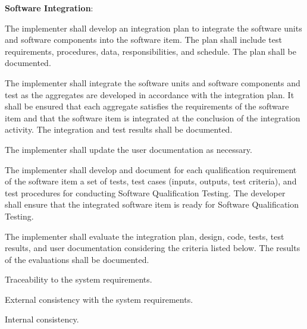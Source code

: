 			\begin{adjustwidth}{2em}{0pt} 

				\begin{compactenum}

					\item {\bf Software Integration}:

					\begin{compactenum}

						\item The implementer shall develop an integration plan to integrate the software units and software components into the software item. The plan shall include test requirements, procedures, data, responsibilities, and schedule. The plan shall be documented.

						\item The implementer shall integrate the software units and software components and test as the aggregates are developed in accordance with the integration plan. It shall be ensured that each aggregate satisfies the requirements of the software item and that the software item is integrated at the conclusion of the integration activity. The integration and test results shall be documented.


						\item The implementer shall update the user documentation as necessary.

						\item The implementer shall develop and document for each qualification requirement of the software item a set of tests, test cases (inputs, outputs, test criteria), and test procedures for conducting Software Qualification Testing. The developer shall ensure that the integrated software item is ready for Software Qualification Testing.

						\item The implementer shall evaluate the integration plan, design, code, tests, test results, and user documentation considering the criteria listed below. The results of the evaluations shall be documented.

						\begin{compactenum}

							\item Traceability to the system requirements.

							\item External consistency with the system requirements.

							\item Internal consistency.


\end{compactenum}
\end{compactenum}
\end{compactenum}
\end{adjustwidth}

